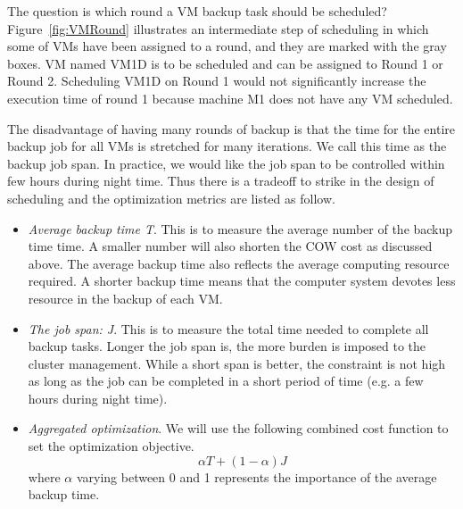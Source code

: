 The question is which round a VM backup task should be scheduled?
Figure~\ref{fig:VMRound} illustrates an intermediate step of scheduling in which
some of VMs have been assigned to a round, and they are marked with the gray boxes. 
VM named  VM1D is to be scheduled and  can be assigned  to Round 1 or Round 2.
Scheduling VM1D on Round 1 would not significantly increase the execution time of round 1
because machine M1 does not have any VM scheduled.

The disadvantage of having many rounds of backup is that the time for  the entire
backup job for all VMs is stretched for many iterations.
We call this time as the backup job span.
In practice, we would like the job span to be controlled within few hours during
night time. Thus there is a tradeoff to strike in the design of scheduling and
the optimization  metrics are listed as follow.
\begin{itemize}
\item {\em Average backup time T}.
This is to measure the average number of the backup time time. 
A smaller number will also shorten the COW cost as discussed above.
The average backup time also reflects the average computing resource required.
A shorter backup time means that the computer system devotes less resource in the backup of each VM. 
\item {\em The job span: J}.
This is to measure the total time needed to complete all backup tasks.
Longer the job span is, the more burden is imposed to the cluster management.
While a short span is better, the  constraint is not high as long as the job can be completed
in a short period of time (e.g. a few hours during night time). 

\item {\em Aggregated optimization}.
We will use the following combined cost function to set the optimization objective.
\[
\alpha T + (1-\alpha) J
\]
where $\alpha$ varying between 0 and 1 represents the importance of the average backup time.
\end{itemize}

